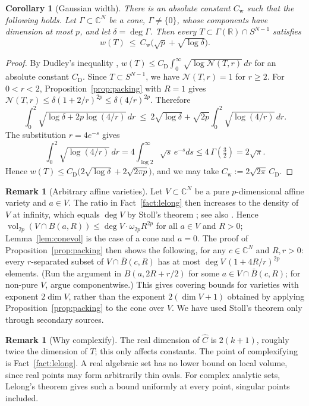 \documentclass[11pt]{article}
\newtheorem{corollary}[theorem]{Corollary}
\theoremstyle{definition}
\newtheorem{remark}[theorem]{Remark}
\numberwithin{equation}{section}
\newcommand{\R}{\mathbb{R}}
\newcommand{\C}{\mathbb{C}}
\newcommand{\Ch}{\widehat{C}}
\newcommand{\cN}{\mathcal{N}}
\DeclareMathOperator{\vol}{vol}
\newcommand{\CD}{C_{\mathrm{D}}}
\newcommand{\Cw}{C_{\mathrm{w}}}
\begin{document}
\begin{corollary}[Gaussian width]\label{cor:width}
There is an absolute constant $\Cw$ such that the following holds. Let $\Gamma\subset\C^N$ be a cone, $\Gamma\neq\{0\}$, whose components have dimension at most $p$, and let $\delta=\deg\Gamma$. Then every $T\subset\Gamma(\R)\cap S^{N-1}$ satisfies
\[
w(T)\ \le\ \Cw\big(\sqrt p+\sqrt{\log\delta}\big).
\]
\end{corollary}

\begin{proof}
By Dudley's inequality \cite[Thm.~8.1.3]{Vershynin}, $w(T)\le\CD\int_0^\infty\sqrt{\log\cN(T,r)}\,dr$ for an absolute constant $\CD$. Since $T\subset S^{N-1}$, we have $\cN(T,r)=1$ for $r\ge2$. For $0<r<2$, Proposition~\ref{prop:packing} with $R=1$ gives $\cN(T,r)\le\delta(1+2/r)^{2p}\le\delta(4/r)^{2p}$. Therefore
\[
\int_0^2\sqrt{\log\delta+2p\log(4/r)}\,dr\ \le\ 2\sqrt{\log\delta}+\sqrt{2p}\int_0^2\sqrt{\log(4/r)}\,dr .
\]
The substitution $r=4e^{-s}$ gives
\[
\int_0^2\sqrt{\log(4/r)}\,dr=4\int_{\log2}^\infty\sqrt s\,e^{-s}ds\le4\,\Gamma(\tfrac32)=2\sqrt\pi .
\]
Hence $w(T)\le\CD\big(2\sqrt{\log\delta}+2\sqrt{2\pi p}\big)$, and we may take $\Cw:=2\sqrt{2\pi}\,\CD$.
\end{proof}

\begin{remark}[Arbitrary affine varieties]\label{rem:stoll}
Let $V\subset\C^N$ be a pure $p$-dimensional affine variety and $a\in V$. The ratio in Fact~\ref{fact:lelong} then increases to the density of $V$ at infinity, which equals $\deg V$ by Stoll's theorem \cite{Stoll}; see also \cite{Chirka}. Hence $\vol_{2p}(V\cap B(a,R))\le\deg V\cdot\omega_{2p}R^{2p}$ for all $a\in V$ and $R>0$; Lemma~\ref{lem:conevol} is the case of a cone and $a=0$. The proof of Proposition~\ref{prop:packing} then shows the following, for any $c\in\C^N$ and $R,r>0$: every $r$-separated subset of $V\cap\bar B(c,R)$ has at most $\deg V\,(1+4R/r)^{2p}$ elements. (Run the argument in $B(a,2R+r/2)$ for some $a\in V\cap\bar B(c,R)$; for non-pure $V$, argue componentwise.) This gives covering bounds for varieties with exponent $2\dim V$, rather than the exponent $2(\dim V+1)$ obtained by applying Proposition~\ref{prop:packing} to the cone over $V$. We have used Stoll's theorem only through secondary sources.
\end{remark}

\begin{remark}[Why complexify]\label{rem:complex}
The real dimension of $\Ch$ is $2(k+1)$, roughly twice the dimension of $T$; this only affects constants. The point of complexifying is Fact~\ref{fact:lelong}. A real algebraic set has no lower bound on local volume, since real points may form arbitrarily thin ovals. For complex analytic sets, Lelong's theorem gives such a bound uniformly at every point, singular points included.
\end{remark}
\end{document}
